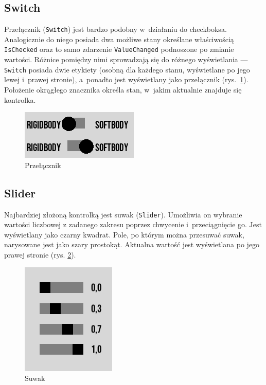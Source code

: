\subsection{Switch}
Przełącznik (\verb|Switch|) jest bardzo podobny w~działaniu do checkboksa. Analogicznie do niego posiada dwa możliwe stany określane właściwością \verb|IsChecked| oraz to samo zdarzenie \verb|ValueChanged| podnoszone po zmianie wartości. Różnice pomiędzy nimi sprowadzają się do różnego wyświetlania --- \verb|Switch| posiada dwie etykiety (osobną dla każdego stanu, wyświetlane po jego lewej i~prawej stronie), a~ponadto jest wyświetlany jako przełącznik (rys.~\ref{fig:switch}). Położenie okrągłego znacznika określa stan, w~jakim aktualnie znajduje się kontrolka.

\begin{figure}[ht]
	\centering
	\includegraphics[width=0.3\linewidth]{images/switch}
	\caption{Przełącznik}
	\label{fig:switch}
\end{figure}

\subsection{Slider}
Najbardziej złożoną kontrolką jest suwak (\verb|Slider|). Umożliwia on wybranie wartości liczbowej z zadanego zakresu poprzez chwycenie i~przeciągnięcie go. Jest wyświetlany jako czarny kwadrat. Pole, po którym można przesuwać suwak, narysowane jest jako szary prostokąt. Aktualna wartość jest wyświetlana po jego prawej stronie (rys. \ref{fig:slider}).

\begin{figure}[ht]
	\centering
	\includegraphics[width=0.3\linewidth]{images/slider}
	\caption{Suwak}
	\label{fig:slider}
\end{figure}

